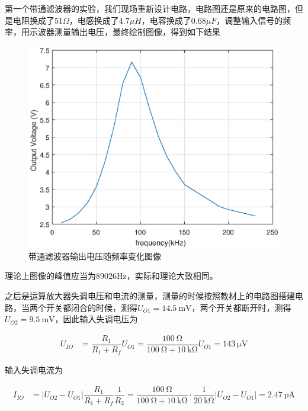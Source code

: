 \documentclass{ctexart}
\newcommand{\si}[1]{\  \mathrm{#1}}
\begin{document}
第一个带通滤波器的实验，我们现场重新设计电路，电路图还是原来的电路图，但是电阻换成了$51 \Omega$，电感换成了$4.7 \mu H$，电容换成了$0.68 \mu F$，调整输入信号的频率，用示波器测量输出电压，最终绘制图像，得到如下结果

\begin{figure}[H]
  \centering
  \includegraphics[width=0.9\linewidth]{figures/带通滤波器}
  \caption{带通滤波器输出电压随频率变化图像}
\end{figure}

理论上图像的峰值应当为89026Hz，实际和理论大致相同。

之后是运算放大器失调电压和电流的测量，测量的时候按照教材上的电路图搭建电路，当两个开关都闭合的时候，测得$U_{O1}=14.5 \si{mV}$，两个开关都断开时，测得$U_{O2}=9.5 \si{mV}$，因此输入失调电压为

\begin{equation*}
  \begin{aligned}
    U_{IO} &= \dfrac{R_1}{R_1 + R_f} U_{O1} = \dfrac{100 \si{\Omega}}{100 \si{\Omega} + 10 \si{k \Omega}} U_{O1} = 143 \si{\mu V}
  \end{aligned}
\end{equation*}

输入失调电流为

\begin{equation*}
  \begin{aligned}
    I_{IO} &= \left| U_{O2} - U_{O1} \right| \dfrac{R_1}{R_1 + R_f} \dfrac{1}{R_2} = \dfrac{100 \si{\Omega}}{100 \si{\Omega} + 10 \si{k \Omega}} \cdot \dfrac{1}{20 \si{k \Omega}} \left| U_{O2} - U_{O1} \right| = 2.47 \si{pA}    
  \end{aligned}
\end{equation*}
\end{document}
